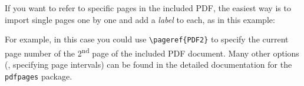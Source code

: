 If you want to refer to specific pages in the included PDF, the easiest way is to import
single pages one by one and add a \emph{label} to each, as in this example:
%
\begin{LaTeXCode}[numbers=none]


\end{LaTeXCode}
%
For example, in this case you could use \verb!\pageref{PDF2}! to specify the current page
number of the 2\textsuperscript{nd} page of the included PDF document. 
Many other options (\eg, specifying page intervals) can be found in the detailed documentation
for the \texttt{pdfpages} package.





